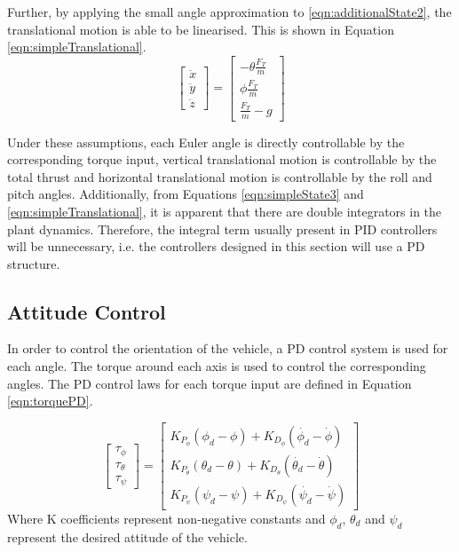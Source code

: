 Further, by applying the small angle approximation to \eqref{eqn:additionalState2}, the translational motion is able to be linearised. This is shown in Equation \eqref{eqn:simpleTranslational}.
\begin{equation}\label{eqn:simpleTranslational}
\begin{bmatrix}
\ddot{x}\\\ddot{y}\\\ddot{z}
\end{bmatrix}
=
\begin{bmatrix}
-\theta\frac{F_{T}}{m}\\
\phi\frac{F_{T}}{m}\\
\frac{F_{T}}{m}-g
\end{bmatrix}
\end{equation}

Under these assumptions, each Euler angle is directly controllable by the corresponding torque input,  vertical translational motion is controllable by the total thrust and horizontal translational motion is controllable by the roll and pitch angles. Additionally, from Equations \ref{eqn:simpleState3} and \ref{eqn:simpleTranslational}, it is apparent that there are double integrators in the plant dynamics\cite{Herzog2016}. Therefore, the integral term usually present in PID controllers will be unnecessary, i.e. the controllers designed in this section will use a PD structure.

\FloatBarrier
\subsection{Attitude Control}
In order to control the orientation of the vehicle, a PD control system is used for each angle. The torque around each axis is used to control the corresponding angles. The PD control laws for each torque input are defined in Equation \ref{eqn:torquePD}.

\begin{equation}\label{eqn:torquePD}
\begin{bmatrix}
\tau_{\phi}\\\tau_{\theta}\\\tau_{\psi}
\end{bmatrix}
=
\begin{bmatrix}
K_{P_{\phi}}(\phi_{d}-\phi)+K_{D_{\phi}}(\dot{\phi_{d}}-\dot{\phi})\\
K_{P_{\theta}}(\theta_{d}-\theta)+K_{D_{\theta}}(\dot{\theta_{d}}-\dot{\theta})\\
K_{P_{\psi}}(\psi_{d}-\psi)+K_{D_{\psi}}(\dot{\psi_{d}}-\dot{\psi})
\end{bmatrix}
\end{equation}
Where K coefficients represent non-negative constants and $\phi_{d}$, $\theta_{d}$ and $\psi_{d}$ represent the desired attitude of the vehicle.


